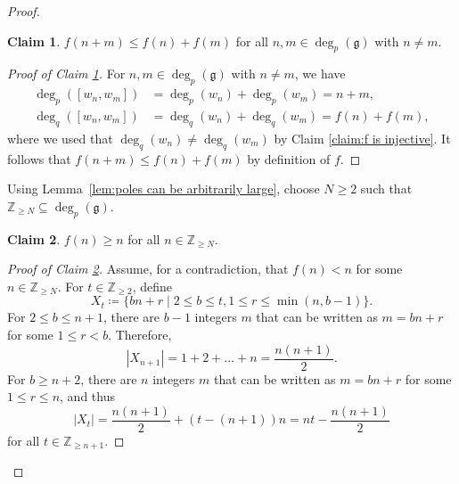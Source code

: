 \documentclass[12pt]{amsart}
\theoremstyle{plain}
\theoremstyle{definition}
\newtheorem{claim}{Claim}
\numberwithin{equation}{section}
\def\g{\mathfrak{g}}
\def\ZZ{\mathbb{Z}}
\begin{document}
\begin{proof}
    \begin{claim}\label{claim:f is sub-additive}
        $f(n + m) \leq f(n) + f(m)$ for all $n,m \in \deg_p(\g)$ with $n \neq m$.
    \end{claim}
    \begin{proof}[Proof of Claim \ref{claim:f is sub-additive}]
        For $n,m \in \deg_p(\g)$ with $n \neq m$, we have
        \begin{align*}
            \deg_p([w_n,w_m]) &= \deg_p(w_n) + \deg_p(w_m) = n + m, \\
            \deg_q([w_n,w_m]) &= \deg_q(w_n) + \deg_q(w_m) = f(n) + f(m),
        \end{align*}
        where we used that $\deg_q(w_n) \neq \deg_q(w_m)$ by Claim \ref{claim:f is injective}. It follows that $f(n + m) \leq f(n) + f(m)$ by definition of $f$.
    \end{proof}

    Using Lemma~\ref{lem:poles can be arbitrarily large}, choose $N \geq 2$ such that $\ZZ_{\geq N} \subseteq \deg_p(\g)$.

    \begin{claim}\label{claim:f is increasing}
        $f(n) \geq n$ for all $n \in \ZZ_{\geq N}$.
    \end{claim}
    \begin{proof}[Proof of Claim \ref{claim:f is increasing}]
        Assume, for a contradiction, that $f(n) < n$ for some $n \in \ZZ_{\geq N}$. For $t \in \ZZ_{\geq 2}$, define
        $$X_t \coloneqq \{b n + r \mid 2 \leq b \leq t, 1 \leq r \leq \min(n,b - 1)\}.$$
        For $2 \leq b \leq n + 1$, there are $b - 1$ integers $m$ that can be written as $m = b n + r$ for some $1 \leq r < b$. Therefore,
        $$|X_{n + 1}| = 1 + 2 + \dots + n = \frac{n(n + 1)}{2}.$$
        For $b \geq n + 2$, there are $n$ integers $m$ that can be written as $m = b n + r$ for some $1 \leq r \leq n$, and thus
        $$|X_t| = \frac{n(n + 1)}{2} + (t - (n + 1))n = n t - \frac{n(n + 1)}{2}$$
        for all $t \in \ZZ_{\geq n + 1}$.
        

\end{proof}
\end{proof}
\end{document}
